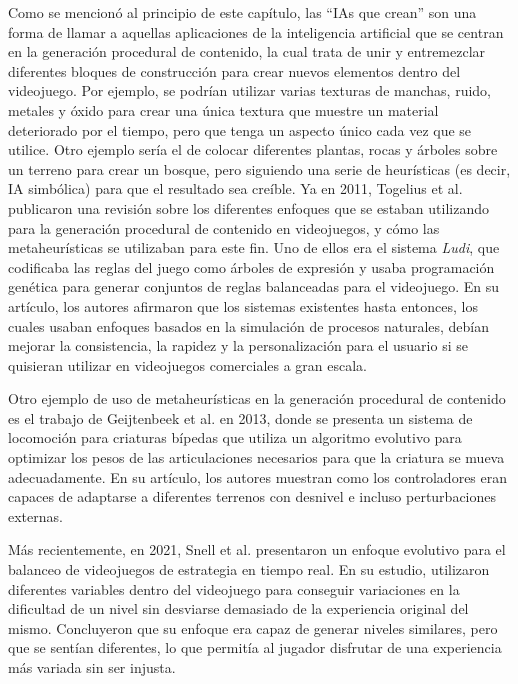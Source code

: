 Como se mencionó al principio de este capítulo, las ``IAs que crean'' son una forma de llamar a aquellas aplicaciones de la inteligencia artificial que se centran en la generación procedural de contenido, la cual trata de unir y entremezclar diferentes bloques de construcción para crear nuevos elementos dentro del videojuego. Por ejemplo, se podrían utilizar varias texturas de manchas, ruido, metales y óxido para crear una única textura que muestre un material deteriorado por el tiempo, pero que tenga un aspecto único cada vez que se utilice. Otro ejemplo sería el de colocar diferentes plantas, rocas y árboles sobre un terreno para crear un bosque, pero siguiendo una serie de heurísticas (es decir, IA simbólica) para que el resultado sea creíble. Ya en 2011, Togelius et al. \cite{togelius_search-based_2011} publicaron una revisión sobre los diferentes enfoques que se estaban utilizando para la generación procedural de contenido en videojuegos, y cómo las metaheurísticas se utilizaban para este fin. Uno de ellos era el sistema \textit{Ludi}, que codificaba las reglas del juego como árboles de expresión y usaba programación genética para generar conjuntos de reglas balanceadas para el videojuego. En su artículo, los autores afirmaron que los sistemas existentes hasta entonces, los cuales usaban enfoques basados en la simulación de procesos naturales, debían mejorar la consistencia, la rapidez y la personalización para el usuario si se quisieran utilizar en videojuegos comerciales a gran escala.

Otro ejemplo de uso de metaheurísticas en la generación procedural de contenido es el trabajo de Geijtenbeek et al. \cite{geijtenbeek_flexible_2013} en 2013, donde se presenta un sistema de locomoción para criaturas bípedas que utiliza un algoritmo evolutivo para optimizar los pesos de las articulaciones necesarios para que la criatura se mueva adecuadamente. En su artículo, los autores muestran como los controladores eran capaces de adaptarse a diferentes terrenos con desnivel e incluso perturbaciones externas.

Más recientemente, en 2021, Snell et al. \cite{snell_evolutionary_2021} presentaron un enfoque evolutivo para el balanceo de videojuegos de estrategia en tiempo real. En su estudio, utilizaron diferentes variables dentro del videojuego para conseguir variaciones en la dificultad de un nivel sin desviarse demasiado de la experiencia original del mismo. Concluyeron que su enfoque era capaz de generar niveles similares, pero que se sentían diferentes, lo que permitía al jugador disfrutar de una experiencia más variada sin ser injusta.

